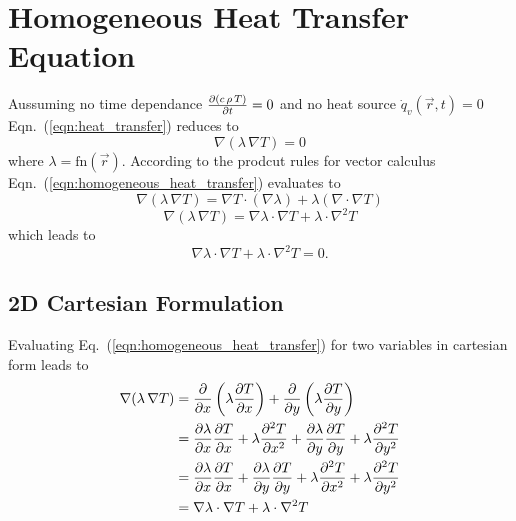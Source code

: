 \section{Homogeneous Heat Transfer Equation}
Aussuming no time dependance $\pdv{(c \, \rho \, T)}{t} = 0$ and no heat source $\dot{q}_v(\vec{r}, t) = 0$ Eqn.~(\ref{eqn:heat_transfer}) reduces to
\begin{equation}
\label{eqn:homogeneous_heat_transfer}
    \nabla (\lambda \, \nabla T )  = 0
\end{equation}
where $\lambda = \mathrm{fn}(\vec{r})$.
According to the prodcut rules for vector calculus Eqn.~(\ref{eqn:homogeneous_heat_transfer}) evaluates to
\begin{equation}
	\nabla (\lambda \, \nabla T ) = \nabla T \cdot (\nabla \lambda) +\lambda \left(\nabla \cdot \nabla T \right)
\end{equation}
\begin{equation}
	\nabla (\lambda \, \nabla T ) = \nabla \lambda \cdot \nabla T + \lambda \cdot \nabla^2 T
\end{equation}
which leads to
\begin{equation}
	\nabla \lambda \cdot \nabla T + \lambda \cdot \nabla^2 T = 0.
\end{equation}

\subsection{2D Cartesian Formulation}
Evaluating Eq.~(\ref{eqn:homogeneous_heat_transfer}) for two variables in cartesian form leads to
\begin{align}
    \nabla (\lambda \, \nabla T )  &= \pdv{}{x} \left(\lambda \pdv{T}{x} \right) + \pdv{}{y} \left(\lambda \pdv{T}{y} \right) \\
    &= \pdv{\lambda}{x} \pdv{T}{x} + \lambda \pdv[2]{T}{x} + \pdv{\lambda}{y} \pdv{T}{y} + \lambda \pdv[2]{T}{y} \\
    &= \pdv{\lambda}{x} \pdv{T}{x} + \pdv{\lambda}{y} \pdv{T}{y} + \lambda \pdv[2]{T}{x} + \lambda \pdv[2]{T}{y} \\
    &= \nabla \lambda \cdot \nabla T + \lambda \cdot \nabla^2 T
\end{align}


